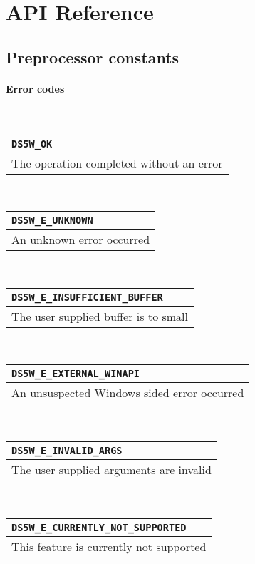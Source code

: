 \section{API Reference}
\subsection{Preprocessor constants}


\newcommand{\tblx}[2]{
	\noindent
	\begin{tabularx}{\textwidth} { | >{\raggedright\arraybackslash}X |  }
		\hline
		\texttt{#1} \\
		\hline
		#2 \\
		\hline
	\end{tabularx}
	\mbox{}\\

}

\newcommand{\tbly}[3]{
	\noindent
	\begin{tabularx}{\textwidth}{|s|b|}
		\midrule %
			#1 & \texttt{#2} \\
		\midrule %
			\multicolumn{2}{|l|}{\begin{minipage}{0.9\linewidth} \noindent #3 \end{minipage}} \\ %
		\midrule %
	\end{tabularx}
	\mbox{}
}

\paragraph{Error codes}
\mbox{}\\

\tblx{DS5W\_OK}{The operation completed without an error}

\tblx{DS5W\_E\_UNKNOWN}{An unknown error occurred}

\tblx{DS5W\_E\_INSUFFICIENT\_BUFFER}{The user supplied buffer is to small }

\tblx{DS5W\_E\_EXTERNAL\_WINAPI}{An unsuspected Windows sided error occurred}

\tblx{DS5W\_E\_INVALID\_ARGS}{The user supplied arguments are invalid}

\tblx{DS5W\_E\_CURRENTLY\_NOT\_SUPPORTED}{This feature is currently not supported}

